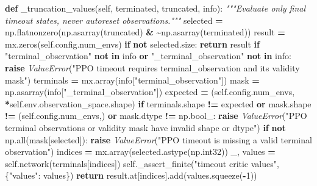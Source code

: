 \documentclass[
  american,
  11pt,
  letterpaper,
]{article}
\newenvironment{Shaded}{\begin{snugshade}}{\end{snugshade}}
\newcommand{\BuiltInTok}[1]{#1}
\newcommand{\CommentTok}[1]{\textcolor[rgb]{0.56,0.35,0.01}{\textit{#1}}}
\newcommand{\ControlFlowTok}[1]{\textcolor[rgb]{0.13,0.29,0.53}{\textbf{#1}}}
\newcommand{\DecValTok}[1]{\textcolor[rgb]{0.00,0.00,0.81}{#1}}
\newcommand{\KeywordTok}[1]{\textcolor[rgb]{0.13,0.29,0.53}{\textbf{#1}}}
\newcommand{\NormalTok}[1]{#1}
\newcommand{\OperatorTok}[1]{\textcolor[rgb]{0.81,0.36,0.00}{\textbf{#1}}}
\newcommand{\PreprocessorTok}[1]{\textcolor[rgb]{0.56,0.35,0.01}{\textit{#1}}}
\newcommand{\StringTok}[1]{\textcolor[rgb]{0.31,0.60,0.02}{#1}}
\newcommand{\VariableTok}[1]{\textcolor[rgb]{0.00,0.00,0.00}{#1}}
\renewenvironment{Shaded}{\par\smallskip}{\par\smallskip}
\begin{document}
\begin{Shaded}
\begin{Highlighting}[]
    \KeywordTok{def}\NormalTok{ \_truncation\_values(}\VariableTok{self}\NormalTok{, terminated, truncated, info):}
        \CommentTok{"""Evaluate only final timeout states, never autoreset observations."""}
\NormalTok{        selected }\OperatorTok{=}\NormalTok{ np.flatnonzero(np.asarray(truncated) }\OperatorTok{\&} \OperatorTok{\textasciitilde{}}\NormalTok{np.asarray(terminated))}
\NormalTok{        result }\OperatorTok{=}\NormalTok{ mx.zeros(}\VariableTok{self}\NormalTok{.config.num\_envs)}
        \ControlFlowTok{if} \KeywordTok{not}\NormalTok{ selected.size:}
            \ControlFlowTok{return}\NormalTok{ result}
        \ControlFlowTok{if} \StringTok{"terminal\_observation"} \KeywordTok{not} \KeywordTok{in}\NormalTok{ info }\KeywordTok{or} \StringTok{"\_terminal\_observation"} \KeywordTok{not} \KeywordTok{in}\NormalTok{ info:}
            \ControlFlowTok{raise} \PreprocessorTok{ValueError}\NormalTok{(}\StringTok{"PPO timeout requires terminal\_observation and its validity mask"}\NormalTok{)}
\NormalTok{        terminals }\OperatorTok{=}\NormalTok{ mx.array(info[}\StringTok{"terminal\_observation"}\NormalTok{])}
\NormalTok{        mask }\OperatorTok{=}\NormalTok{ np.asarray(info[}\StringTok{"\_terminal\_observation"}\NormalTok{])}
\NormalTok{        expected }\OperatorTok{=}\NormalTok{ (}\VariableTok{self}\NormalTok{.config.num\_envs, }\OperatorTok{*}\VariableTok{self}\NormalTok{.env.observation\_space.shape)}
        \ControlFlowTok{if}\NormalTok{ terminals.shape }\OperatorTok{!=}\NormalTok{ expected }\KeywordTok{or}\NormalTok{ mask.shape }\OperatorTok{!=}\NormalTok{ (}\VariableTok{self}\NormalTok{.config.num\_envs,) }\KeywordTok{or}\NormalTok{ mask.dtype }\OperatorTok{!=}\NormalTok{ np.bool\_:}
            \ControlFlowTok{raise} \PreprocessorTok{ValueError}\NormalTok{(}\StringTok{"PPO terminal observations or validity mask have invalid shape or dtype"}\NormalTok{)}
        \ControlFlowTok{if} \KeywordTok{not}\NormalTok{ np.}\BuiltInTok{all}\NormalTok{(mask[selected]):}
            \ControlFlowTok{raise} \PreprocessorTok{ValueError}\NormalTok{(}\StringTok{"PPO timeout is missing a valid terminal observation"}\NormalTok{)}
\NormalTok{        indices }\OperatorTok{=}\NormalTok{ mx.array(selected.astype(np.int32))}
\NormalTok{        \_, values }\OperatorTok{=} \VariableTok{self}\NormalTok{.network(terminals[indices])}
        \VariableTok{self}\NormalTok{.\_assert\_finite(}\StringTok{"timeout critic values"}\NormalTok{, \{}\StringTok{"values"}\NormalTok{: values\})}
        \ControlFlowTok{return}\NormalTok{ result.at[indices].add(values.squeeze(}\OperatorTok{{-}}\DecValTok{1}\NormalTok{))}


\end{Highlighting}
\end{Shaded}
\end{document}
